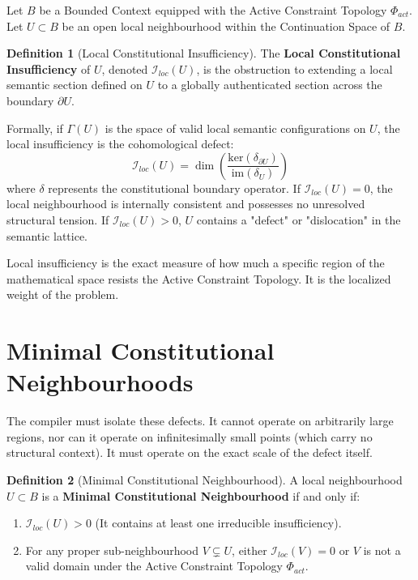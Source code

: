 \documentclass[12pt,openany]{extbook}
\theoremstyle{plain}
\theoremstyle{definition}
\newtheorem{definition}{Definition}[chapter]
\begin{document}
Let $B$ be a Bounded Context equipped with the Active Constraint Topology $\Phi_{act}$. Let $U \subset B$ be an open local neighbourhood within the Continuation Space of $B$. 

\begin{definition}[Local Constitutional Insufficiency]
The \textbf{Local Constitutional Insufficiency} of $U$, denoted $\mathcal{I}_{loc}(U)$, is the obstruction to extending a local semantic section defined on $U$ to a globally authenticated section across the boundary $\partial U$. 

Formally, if $\Gamma(U)$ is the space of valid local semantic configurations on $U$, the local insufficiency is the cohomological defect:
\[
\mathcal{I}_{loc}(U) = \dim \left( \frac{\text{ker}(\delta_{\partial U})}{\text{im}(\delta_{U})} \right)
\]
where $\delta$ represents the constitutional boundary operator. If $\mathcal{I}_{loc}(U) = 0$, the local neighbourhood is internally consistent and possesses no unresolved structural tension. If $\mathcal{I}_{loc}(U) > 0$, $U$ contains a "defect" or "dislocation" in the semantic lattice.
\end{definition}

Local insufficiency is the exact measure of how much a specific region of the mathematical space resists the Active Constraint Topology. It is the localized weight of the problem.

\section{Minimal Constitutional Neighbourhoods}

The compiler must isolate these defects. It cannot operate on arbitrarily large regions, nor can it operate on infinitesimally small points (which carry no structural context). It must operate on the exact scale of the defect itself.

\begin{definition}[Minimal Constitutional Neighbourhood]
A local neighbourhood $U \subset B$ is a \textbf{Minimal Constitutional Neighbourhood} if and only if:
\begin{enumerate}
    \item $\mathcal{I}_{loc}(U) > 0$ (It contains at least one irreducible insufficiency).
    \item For any proper sub-neighbourhood $V \subsetneq U$, either $\mathcal{I}_{loc}(V) = 0$ or $V$ is not a valid domain under the Active Constraint Topology $\Phi_{act}$.
\end{enumerate}
\end{definition}
\end{document}
